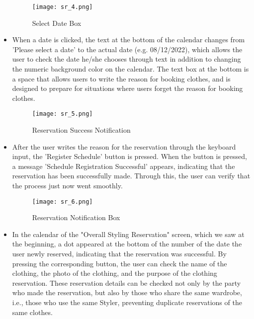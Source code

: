 \documentclass[conference]{IEEEtran}
\begin{document}
\begin{itemize}
    \begin{figure}[htbp]
    \centerline{\texttt{[image: sr\_4.png]}}
    \label{fig}
    \caption{Select Date Box}
    \end{figure}
    \item When a date is clicked, the text at the bottom of the calendar changes from 'Please select a date' to the actual date (e.g. 08/12/2022), which allows the user to check the date he/she chooses through text in addition to changing the numeric background color on the calendar.
    The text box at the bottom is a space that allows users to write the reason for booking clothes, and is designed to prepare for situations where users forget the reason for booking clothes.\\

    \begin{figure}[htbp]
    \centerline{\texttt{[image: sr\_5.png]}}
    \label{fig}
    \caption{Reservation Success Notification}
    \end{figure}
    \item After the user writes the reason for the reservation through the keyboard input, the 'Register Schedule' button is pressed. When the button is pressed, a message 'Schedule Registration Successful' appears, indicating that the reservation has been successfully made. Through this, the user can verify that the process just now went smoothly.\\
    
    \begin{figure}[htbp]
    \centerline{\texttt{[image: sr\_6.png]}}
    \label{fig}
    \caption{Reservation Notification Box}
    \end{figure}
    \item In the calendar of the "Overall Styling Reservation" screen, which we saw at the beginning, a dot appeared at the bottom of the number of the date the user newly reserved, indicating that the reservation was successful. By pressing the corresponding button, the user can check the name of the clothing, the photo of the clothing, and the purpose of the clothing reservation. These reservation details can be checked not only by the party who made the reservation, but also by those who share the same wardrobe, i.e., those who use the same Styler, preventing duplicate reservations of the same clothes.\\
    
\end{itemize}
\end{document}
